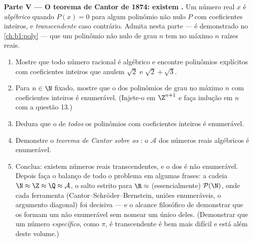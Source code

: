 \begin{problem}
\medskip
\noindent\textbf{Parte V --- O teorema de Cantor de 1874: existem .} Um número real $x$ é \emph{algébrico}
 quando $P(x) = 0$ para algum polinômio não nulo
$P$ com coeficientes inteiros, e \emph{transcendente}
 caso contrário. Admita nesta parte --- é
demonstrado no \cref{ch:b1:poly} --- que um polinômio não nulo de
grau $n$ tem no máximo $n$ raízes reais.
\begin{enumerate}
  \item Mostre que todo número racional é algébrico e encontre
        polinômios explícitos com coeficientes inteiros que anulem
        $\sqrt 2$ e $\sqrt 2 + \sqrt 3$.
  \item Para $n \in \N$ fixado, mostre que o  dos polinômios de
        grau no máximo $n$ com coeficientes inteiros é enumerável.
        (Injete-o em $\Z^{n+1}$ e faça indução em $n$ com
        a questão 13.)
  \item Deduza que o  de \emph{todos} os polinômios com
        coeficientes inteiros é enumerável.
  \item Demonstre o \emph{teorema de Cantor sobre os }:
        o  $\mathcal{A}$ dos números reais algébricos é enumerável.
  \item Conclua: existem números reais transcendentes, e o  dos
         é não enumerável. Depois faça o balanço
        de todo o problema em algumas frases: a cadeia $\N \approx
        \Z \approx \Q \approx \mathcal{A}$, o salto estrito para $\R
        \approx$ (essencialmente) $\mathcal{P}(\N)$, onde cada ferramenta
        (Cantor--Schröder--Bernstein, uniões enumeráveis, o
        argumento diagonal) foi decisiva --- e o alcance filosófico de
        demonstrar que os  formam um  não
        enumerável sem nomear um único deles. (Demonstrar que um número
        \emph{específico}, como $\pi$, é transcendente é bem mais difícil
        e está além deste volume.)
\end{enumerate}
\end{problem}
